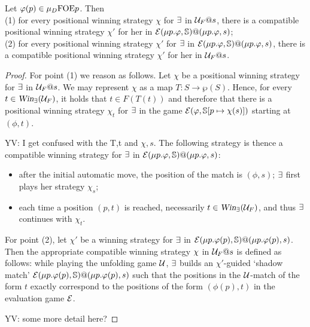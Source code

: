 \begin{proposition}\label{p:unfold=evalgame2}
Let %
$\varphi(p) \in \mu_{D}\mathrm{FOE}{p}$. Then 
\\(1) for every positional winning strategy $\chi$ for $\exists$ in $\mathcal{U}_F@s$,
there is a compatible positional winning strategy $\chi'$ for her in 
$\mathcal{E}(\mu p.\varphi,\mathbb{S})@(\mu p.\varphi,s)$;
\\(2) for every positional winning strategy $\chi'$ for $\exists$ in 
$\mathcal{E}(\mu p.\varphi,\mathbb{S})@(\mu p.\varphi,s)$, there is a compatible  positional 
winning strategy $\chi'$ for her in $\mathcal{U}_F@s$.
\end{proposition}

\begin{proof}
For point (1) we reason as follows. 
Let $\chi$  be a positional winning strategy for $\exists$ in $\mathcal{U}_F@s$. 
We may represent $\chi$ as a map $T: S \to \wp{(S)}$. 
Hence, for every $t \in \win_{\eloise}(\UG_{F})$, it holds that $t \in F(T(t))$ 
and therefore that there is a positional winning strategy $\chi_t$ for $\exists$ 
in the game $\mathcal{E}(\varphi,\mathbb{S}[p \mapsto \chi(s)])$ starting at $(\phi,t)$. 
\btbs
\item
YV: I get confused with the T,t and $\chi, s$.
\etbs
The following  strategy is thence a compatible winning strategy for $\exists$ in
$\mathcal{E}(\mu p.\varphi,\mathbb{S})@(\mu p.\varphi,s)$:
\begin{itemize}
\item after the initial automatic move, the position of the match is $(\phi,s)$; 
$\exists$ first plays her strategy $\chi_s$;
\item each time a position $(p,t)$ is reached, necessarily 
$t \in \win_{\eloise}(\UG_{F})$, and thus $\exists$ continues with $\chi_t$.
\end{itemize}
For point (2), let $\chi'$ be a winning strategy for $\exists$ in
$\mathcal{E}(\mu p.\varphi(p),\mathbb{S})@(\mu p.\varphi(p),s)$. 
Then the appropriate compatible winning strategy $\chi$ in $\mathcal{U}_{F}@s$ is 
defined as follows: while playing the unfolding game $\mathcal{U}$, $\exists$ builds an 
$\chi'$-guided `shadow match' $\mathcal{E}(\mu p.\varphi(p),\mathbb{S})@(\mu p.\varphi(p),s)$ 
such that the positions in the $\mathcal{U}$-match of the form $t$ exactly correspond to
the positions of the form $(\phi(p),t)$ in the evaluation game $\mathcal{E}$.
\btbs
\item YV: some more detail here?
\etbs
\end{proof}

